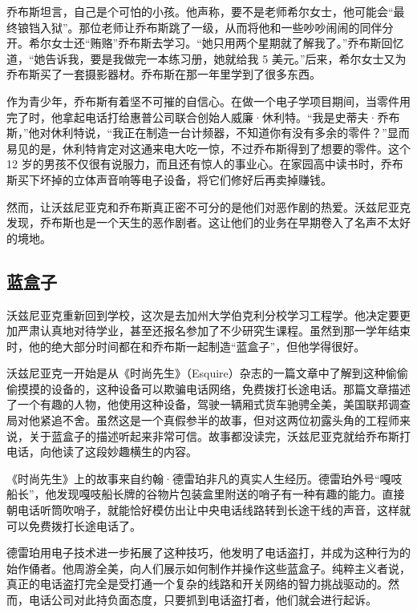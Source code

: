 \documentclass[12pt,UTF8]{ctexbook}
\begin{document}
乔布斯坦言，自己是个可怕的小孩。他声称，要不是老师希尔女士，他可能会“最终锒铛入狱”。那位老师让乔布斯跳了一级，从而将他和一些吵吵闹闹的同伴分开。希尔女士还“贿赂”乔布斯去学习。“她只用两个星期就了解我了。”乔布斯回忆道，“她告诉我，要是我做完一本练习册，她就给我 5 美元。”后来，希尔女士又为乔布斯买了一套摄影器材。乔布斯在那一年里学到了很多东西。

作为青少年，乔布斯有着坚不可摧的自信心。在做一个电子学项目期间，当零件用完了时，他拿起电话打给惠普公司联合创始人威廉·休利特。“我是史蒂夫·乔布斯，”他对休利特说，“我正在制造一台计频器，不知道你有没有多余的零件？”显而易见的是，休利特肯定对这通来电大吃一惊，不过乔布斯得到了想要的零件。这个 12 岁的男孩不仅很有说服力，而且还有惊人的事业心。在家园高中读书时，乔布斯买下坏掉的立体声音响等电子设备，将它们修好后再卖掉赚钱。

然而，让沃兹尼亚克和乔布斯真正密不可分的是他们对恶作剧的热爱。沃兹尼亚克发现，乔布斯也是一个天生的恶作剧者。这让他们的业务在早期卷入了名声不太好的境地。





\subsection{蓝盒子}


沃兹尼亚克重新回到学校，这次是去加州大学伯克利分校学习工程学。他决定要更加严肃认真地对待学业，甚至还报名参加了不少研究生课程。虽然到那一学年结束时，他的绝大部分时间都在和乔布斯一起制造“蓝盒子”，但他学得很好。

沃兹尼亚克一开始是从《时尚先生》（Esquire）杂志的一篇文章中了解到这种偷偷偷摸摸的设备的，这种设备可以欺骗电话网络，免费拨打长途电话。那篇文章描述了一个有趣的人物，他使用这种设备，驾驶一辆厢式货车驰骋全美，美国联邦调查局对他紧追不舍。虽然这是一个真假参半的故事，但对这两位初露头角的工程师来说，关于蓝盒子的描述听起来非常可信。故事都没读完，沃兹尼亚克就给乔布斯打电话，向他读了这段妙趣横生的内容。

《时尚先生》上的故事来自约翰·德雷珀非凡的真实人生经历。德雷珀外号“嘎吱船长”，他发现嘎吱船长牌的谷物片包装盒里附送的哨子有一种有趣的能力。直接朝电话听筒吹哨子，就能恰好模仿出让中央电话线路转到长途干线的声音，这样就可以免费拨打长途电话了。

德雷珀用电子技术进一步拓展了这种技巧，他发明了电话盗打，并成为这种行为的始作俑者。他周游全美，向人们展示如何制作并操作这些蓝盒子。纯粹主义者说，真正的电话盗打完全是受打通一个复杂的线路和开关网络的智力挑战驱动的。然而，电话公司对此持负面态度，只要抓到电话盗打者，他们就会进行起诉。
\end{document}
